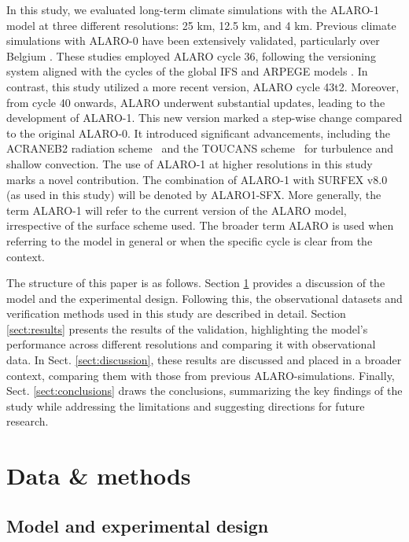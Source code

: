 \documentclass[journal abbreviation, manuscript]{copernicus}
\begin{document}
In this study, we evaluated long-term climate simulations with the ALARO-1 model at three different resolutions: 25 km, 12.5 km, and 4 km. 
Previous climate simulations with ALARO-0 have been extensively validated, particularly over Belgium \citep{de_troch_multiscale_2013, hamdi_evaluating_2014, giot_validation_2016, tabari_local_2016, berckmans_reinitialised_2017, top_evaluation_2021}. 
These studies employed ALARO cycle 36, following the versioning system aligned with the cycles of the global IFS and ARPEGE models \citep{termonia_aladin_2018}. 
In contrast, this study utilized a more recent version, ALARO cycle 43t2. 
Moreover, from cycle 40 onwards, ALARO underwent substantial updates, leading to the development of ALARO-1.
This new version marked a step-wise change compared to the original ALARO-0.
It introduced significant advancements, including the ACRANEB2 radiation scheme~\citep{masek_single_2016, geleyn_single_2017} and the TOUCANS scheme~\citep{duran_compact_2014, marquet_general_2013} for turbulence and shallow convection. 
The use of ALARO-1 at higher resolutions in this study marks a novel contribution.
The combination of ALARO-1 with SURFEX v8.0 (as used in this study) will be denoted by ALARO1-SFX.
More generally, the term ALARO-1 will refer to the current version of the ALARO model, irrespective of the surface scheme used. 
The broader term ALARO is used when referring to the model in general or when the specific cycle is clear from the context.

The structure of this paper is as follows. Section \ref{sect:data_methods} provides a discussion of the model and the experimental design. 
Following this, the observational datasets and verification methods used in this study are described in detail. 
Section \ref{sect:results} presents the results of the validation, highlighting the model's performance across different resolutions and comparing it with observational data. 
In Sect. \ref{sect:discussion}, these results are discussed and placed in a broader context, comparing them with those from previous ALARO-simulations.
Finally, Sect. \ref{sect:conclusions} draws the conclusions, summarizing the key findings of the study while addressing the limitations and suggesting directions for future research.


\section{Data \& methods}
\label{sect:data_methods}

\subsection{Model and experimental design}
\end{document}
